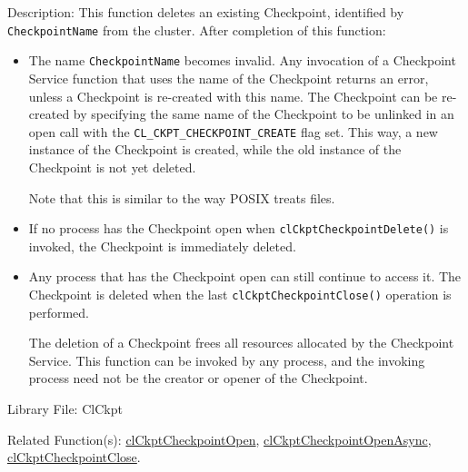 \begin{flushleft}
\begin{Desc}
\begin{description}
\end{description}
\end{Desc}
\begin{Desc}
\item[Description:]This function deletes an existing Checkpoint, identified by {\tt{Checkpoint\-Name}} from the cluster. 
 After completion of this function:
 \begin{itemize}
\item The name {\tt{Checkpoint\-Name}} becomes invalid. Any invocation of a Checkpoint Service function that uses the name of the 
Checkpoint returns an error, unless a Checkpoint is re-created with this name. The Checkpoint can be re-created by specifying the same name of the
Checkpoint 
to be unlinked in an open call with the {\tt{CL\_\-CKPT\_\-CHECKPOINT\_\-CREATE}} flag set. This way, a new instance of the Checkpoint is created, while 
the old instance of the Checkpoint is not yet deleted. \par
 Note that this is similar to the way POSIX treats files. \item If no process has the Checkpoint open when
{\tt{clCkptCheckpointDelete()}} is invoked, the Checkpoint is immediately deleted. 
 \item Any process that has the Checkpoint open can still continue
 to access it. The Checkpoint is deleted when the last {\tt{clCkptCheckpointClose()}} operation is performed.
 \par
 \par
 The deletion of a Checkpoint frees all resources allocated by the Checkpoint Service. This function can be invoked by any process, and the 
 invoking process need not be the creator or opener of the Checkpoint.\end{itemize}
\end{Desc}
\begin{Desc}
\item[Library File:]Cl\-Ckpt\end{Desc}
\begin{Desc}
\item[Related Function(s):]\hyperlink{pageckpt103}{cl\-Ckpt\-Checkpoint\-Open}, \hyperlink{pageckpt104}{cl\-Ckpt\-Checkpoint\-Open\-Async}, 
\hyperlink{pageckpt105}{cl\-Ckpt\-Checkpoint\-Close}. \end{Desc}
\newpage



\end{flushleft}
